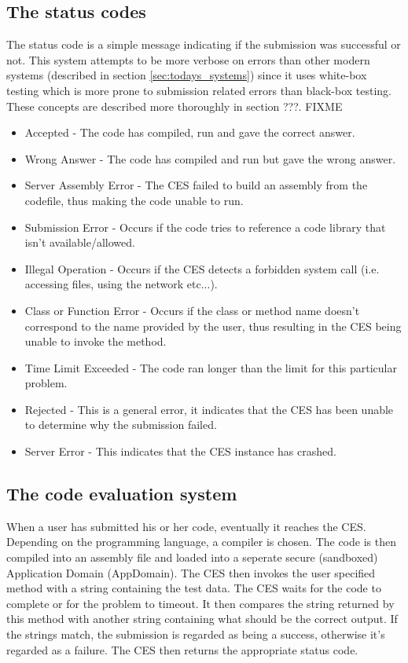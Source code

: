 \subsection{The status codes} \label{subsec:status_codes}
The status code is a simple message indicating if the submission was successful or not. This system attempts to be more verbose on errors than other modern systems (described in section \ref{sec:todays_systems}) since it uses white-box testing which is more prone to submission related errors than black-box testing. These concepts are described more thoroughly in section ???. FIXME
\begin{itemize}
	\item Accepted - The code has compiled, run and gave the correct answer.
	\item Wrong Answer - The code has compiled and run but gave the wrong answer.
	\item Server Assembly Error - The CES failed to build an assembly from the codefile, thus making the code unable to run.
	\item Submission Error - Occurs if the code tries to reference a code library that isn't available/allowed. 
	\item Illegal Operation - Occurs if the CES detects a forbidden system call (i.e. accessing files, using the network etc...).
	\item Class or Function Error - Occurs if the class or method name doesn't correspond to the name provided by the user, thus resulting in the CES being unable to invoke the method.
	\item Time Limit Exceeded - The code ran longer than the limit for this particular problem.
	\item Rejected - This is a general error, it indicates that the CES has been unable to determine why the submission failed. 
	\item Server Error - This indicates that the CES instance has crashed.
\end{itemize}



\subsection{The code evaluation system}
When a user has submitted his or her code, eventually it reaches the CES. Depending on the programming language, a compiler is chosen. The code is then compiled into an assembly file and loaded into a seperate secure (sandboxed) Application Domain (AppDomain). The CES then invokes the user specified method with a string containing the test data. The CES waits for the code to complete or for the problem to timeout. It then compares the string returned by this method with another string containing what should be the correct output. If the strings match, the submission is regarded as being a success, otherwise it's regarded as a failure. The CES then returns the appropriate status code. 




